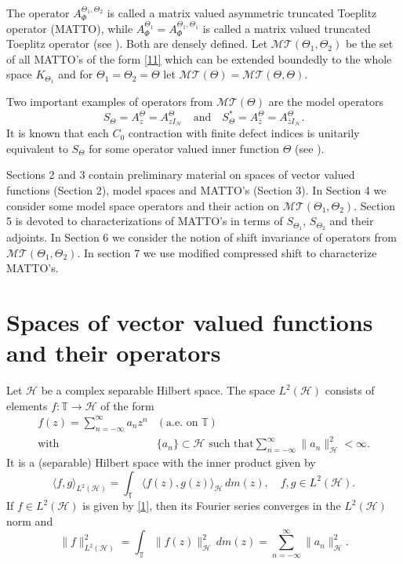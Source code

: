 \documentclass[11pt]{amsart}
\numberwithin{equation}{section}
\newcommand{\hsp}{\mathcal{H}}
\newcommand{\h}{\mathcal{H}}
\newcommand{\z}{{z}}
\theoremstyle{definition}
\numberwithin{equation}{section}
\begin{document}
 The operator $A_{\Phi}^{\Theta_{1}, \Theta_{2}}$ is called a matrix valued asymmetric truncated Toeplitz operator (MATTO), while $A_{\Phi}^{\Theta_{1}}=A_{\Phi}^{\Theta_{1}, \Theta_{1}}$ is called a matrix valued truncated Toeplitz operator (see \cite{KT}). Both are densely defined. Let $\mathcal{MT}(\Theta_{1},\Theta_{2})$ be the set of all MATTO's of the form \eqref{11} which can be extended boundedly to the whole space $K_{\Theta_{1}}$ and for $\Theta_{1}=\Theta_{2}=\Theta$ let $\mathcal{MT}(\Theta )=\mathcal{MT}(\Theta,\Theta)$.

 Two important examples of operators from $\mathcal{MT}(\Theta )$ are the model operators
\begin{equation}\label{modl}
S_{\Theta}=A_{z }^{\Theta }=A_{zI_{\hsp}}^{\Theta }\quad\text{and}\quad S_{\Theta }^*=A_{\bar z }^{\Theta }=A_{\bar zI_{\hsp}}^{\Theta  }.
\end{equation} It is known that each $C_0$ contraction with finite defect indices is unitarily equivalent to $S_{\Theta}$ for some operator valued inner function $\Theta$ (see \cite[Chapter IV]{NF}).

 Sections 2 and 3 contain preliminary material on spaces of vector valued functions (Section 2), model spaces and MATTO's (Section 3). In Section 4 we consider some model space operators and their action on $\mathcal{MT}(\Theta_{1},\Theta_{2})$. Section 5 is devoted to characterizations of MATTO's in terms of $S_{\Theta_{1}}$, $S_{\Theta_{2}}$ and their adjoints. In Section 6 we consider the notion of shift invariance of operators from $\mathcal{MT}(\Theta_{1},\Theta_{2})$. In section 7 we use modified compressed shift to characterize MATTO's.



\section{Spaces of vector valued functions and their operators}\label{s2}


Let $\hsp$ be a complex separable Hilbert space. The space $L^2(\hsp)$ consists of elements $f:\mathbb{T}\to \hsp$ of the form
\begin{equation}\label{1}
 \begin{array}{rl}
 f(\z)=\sum\limits_{n=-\infty}^{\infty}a_{n}\z^n&  (\text{a.e. on }\mathbb{T})\\
  \text{with}&\{a_{n}\}\subset\hsp\text{ such that}  \sum\limits_{n=-\infty}^{\infty}\|a_{n}\|_\hsp^{2}<\infty.\end{array}\end{equation}
It is a (separable) Hilbert space with the inner product given by
\begin{equation*}
\langle f,g\rangle_{L^{2}(\hsp)}=\int_{\mathbb{T}}\langle f(\z),g(\z)\rangle_{\hsp}\,dm(\z),\quad f,g\in L^2(\hsp).
\end{equation*}
If $f\in L^2(\hsp)$ is given by \eqref{1}, then its Fourier series converges in the  $L^2(\h)$ norm and
$$\|f\|_{L^2(\hsp)}^2=\int_{\mathbb{T}} \| f(\z)\|_\hsp^2\,dm(\z)=\sum\limits_{n=-\infty}^{\infty}\|a_{n}\|_\hsp^{2}.$$
\end{document}
